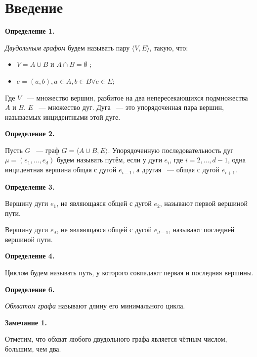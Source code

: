 \documentclass[14pt]{mmcs-article}
\begin{document}
\section*{Введение}

\textbf{Определение 1.}

\textsl{Двудольным графом} будем называть пару $\langle V,E \rangle$, такую, что:

\begin{itemize}
    \item $V = A \cup B$ и $A \cap B = \emptyset$ ;
    \item $e = (a, b), a \in A, b \in B \forall e \in E$;
\end{itemize}

Где $V$ ~--- множество вершин, разбитое на два непересекающихся подмножества $A$ и $B$.
$E$ ~--- множество дуг. Дуга ~--- это упорядоченная пара вершин, называемых инцидентными этой дуге.

\textbf{Определение 2.}



Пусть $G$ ~--- граф $G = \langle A \cup B, E \rangle$.
Упорядоченную последовательность дуг $\mu = (e_1, ..., e_d)$ будем называть путём, если у дуги $e_i$, где $i = 2, ..., d-1$, одна инцидентная вершина общая с дугой $e_{i-1}$, а другая ~--- общая с дугой $e_{i+1}$.

\textbf{Определение 3.}


Вершину дуги $e_1$, не являющаяся общей с дугой $e_2$, называют первой вершиной пути.

Вершину дуги $e_d$, не являющаяся общей с дугой $e_{d-1}$, называют последней вершиной пути.

\textbf{Определение 4.}

Циклом будем называть путь, у которого совпадают первая и последняя вершины.

\textbf{Определение 6.}

\textsl{Обхватом графа} называют длину его минимального цикла.

\textbf{Замечание 1.}

Отметим, что обхват любого двудольного графа является чётным числом, большим, чем два.
\end{document}
